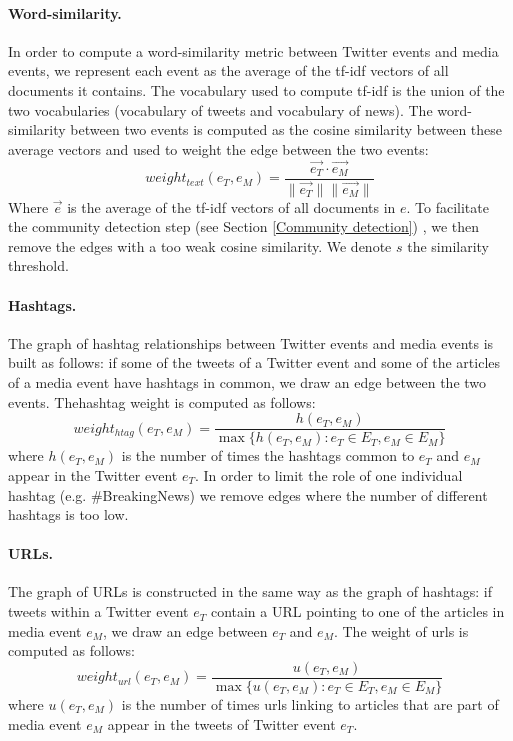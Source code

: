 \paragraph{Word-similarity.}
In order to compute a word-similarity metric between Twitter events and media events, we represent each event as the average of the tf-idf vectors of all documents it contains. The vocabulary used to compute tf-idf is the union of the two vocabularies (vocabulary of tweets and vocabulary of news). The word-similarity between two events is computed as the cosine similarity between these average vectors and used to weight the edge between the two events:
	\begin{equation}
    weight_{text}(e_T, e_M) = \frac{\vec{e_T} \cdot \vec{e_M}}{\| \vec{e_T}\|\| \vec{e_M}\|}
	\end{equation}
Where $\vec{e}$ is the average of the tf-idf vectors of all documents in $e$. To facilitate the community detection step (see Section \ref{Community detection}) , we then remove the edges with a too weak cosine similarity. We denote $s$ the similarity threshold.

\paragraph{Hashtags.} The graph of hashtag relationships between Twitter events and media events is built as follows: if some of the tweets of a Twitter event and some of the articles of a media event have hashtags in common, we draw an edge between the two events. Thehashtag weight is computed as follows:
\begin{equation}
    weight_{htag}(e_T, e_M) = \frac{h(e_T, e_M)}{\max \{h(e_T, e_M): e_T \in E_T,e_M \in E_M \}}
\end{equation}
where $h(e_T, e_M)$ is the number of times the hashtags common to $e_T$ and $e_M$ appear in the Twitter event $e_T$. In order to limit the role of one individual hashtag (e.g. \#BreakingNews) we remove edges where the number of different hashtags is too low.

\paragraph{URLs.} The graph of URLs is constructed in the same way as the graph of hashtags: if tweets within a Twitter event $e_T$ contain a URL pointing to one of the articles in media event $e_M$, we draw an edge between $e_T$ and $e_M$. The weight of urls is computed as follows:
\begin{equation}
    weight_{url}(e_T, e_M) = \frac{u(e_T, e_M)}{\max \{u(e_T, e_M): e_T \in E_T,e_M \in E_M \}}
\end{equation}
where $u(e_T, e_M)$ is the number of times urls linking to articles that are part of media event $e_M$ appear in the tweets of Twitter event $e_T$.

